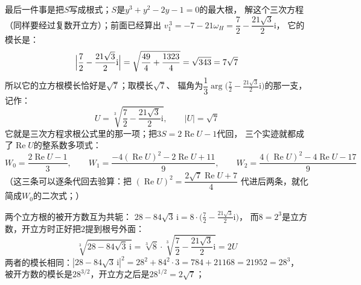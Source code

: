 \documentclass[UTF8,a4paper,11pt]{ctexart}
\newcommand{\ii}{\mathrm{i}}
\begin{document}
最后一件事是把$S$写成根式；$S$是$y^3+y^2-2y-1=0$的最大根，
解这个三次方程（同样要经过复数开立方）；前面已经算出
$v_1^{\,3}=-7-21\omega_H=\dfrac72-\dfrac{21\sqrt3}{2}\ii$，
它的模长是：
\[
 \Bigl|\frac72-\frac{21\sqrt3}{2}\ii\Bigr|
 =\sqrt{\frac{49}{4}+\frac{1323}{4}}=\sqrt{343}=7\sqrt7
\]
所以它的立方根模长恰好是$\sqrt7$；取模长$\sqrt7$、
辐角为$\dfrac13\arg\bigl(\frac72-\frac{21\sqrt3}{2}\ii\bigr)$的那一支，
记作：
\[
 U=\sqrt[3]{\frac72-\frac{21\sqrt3}{2}\ii},
 \qquad |U|=\sqrt7
\]
它就是三次方程求根公式里的那一项；把$3S=2\operatorname{Re}U-1$代回，
三个实迹就都成了$\operatorname{Re}U$的整系数多项式：
\[
 W_0=\frac{2\operatorname{Re}U-1}{3},\qquad
 W_1=\frac{-4(\operatorname{Re}U)^2-2\operatorname{Re}U+11}{9},\qquad
 W_2=\frac{4(\operatorname{Re}U)^2-4\operatorname{Re}U-17}{9}
\]
（这三条可以逐条代回去验算：把
$(\operatorname{Re}U)^2=\dfrac{2\sqrt7\operatorname{Re}U+7}{4}$
代进后两条，就化简成$W_0$的二次式；）\par

两个立方根的被开方数互为共轭：
$28-84\sqrt3\,\ii=8\cdot\bigl(\frac72-\frac{21\sqrt3}{2}\ii\bigr)$，
而$8=2^3$是立方数，开立方时正好把$2$提到根号外面：
\[
 \sqrt[3]{28-84\sqrt3\,\ii}
 =\sqrt[3]{8}\cdot\sqrt[3]{\frac72-\frac{21\sqrt3}{2}\ii}=2U
\]
两者的模长相同：$|28-84\sqrt3\,\ii|^2=28^2+84^2\cdot3=784+21168=21952=28^3$，
被开方数的模长是$28^{3/2}$，开立方之后是$28^{1/2}=2\sqrt7$；\par
\end{document}
